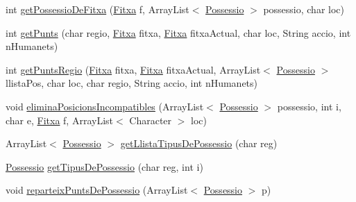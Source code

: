 \begin{DoxyCompactItemize}
int \mbox{\hyperlink{class_tauler_aa60647e3555961f2796381dab7c7f2f7}{get\+Possessio\+De\+Fitxa}} (\mbox{\hyperlink{class_fitxa}{Fitxa}} f, Array\+List$<$ \mbox{\hyperlink{class_possessio}{Possessio}} $>$ possessio, char loc)
\item 
int \mbox{\hyperlink{class_tauler_a39fe2ad5d190905b65b8d86440062ce6}{get\+Punts}} (char regio, \mbox{\hyperlink{class_fitxa}{Fitxa}} fitxa, \mbox{\hyperlink{class_fitxa}{Fitxa}} fitxa\+Actual, char loc, String accio, int n\+Humanets)
\item 
int \mbox{\hyperlink{class_tauler_a6e0887ae8dedc793bace05d8b75dfd98}{get\+Punts\+Regio}} (\mbox{\hyperlink{class_fitxa}{Fitxa}} fitxa, \mbox{\hyperlink{class_fitxa}{Fitxa}} fitxa\+Actual, Array\+List$<$ \mbox{\hyperlink{class_possessio}{Possessio}} $>$ llista\+Pos, char loc, char regio, String accio, int n\+Humanets)
\item 
void \mbox{\hyperlink{class_tauler_a4ee1a514621dca60a453851021c4d91b}{elimina\+Posicions\+Incompatibles}} (Array\+List$<$ \mbox{\hyperlink{class_possessio}{Possessio}} $>$ possessio, int i, char e, \mbox{\hyperlink{class_fitxa}{Fitxa}} f, Array\+List$<$ Character $>$ loc)
\item 
Array\+List$<$ \mbox{\hyperlink{class_possessio}{Possessio}} $>$ \mbox{\hyperlink{class_tauler_afcb2ec44c6e489651e68990a1e65cb49}{get\+Llista\+Tipus\+De\+Possessio}} (char reg)
\item 
\mbox{\hyperlink{class_possessio}{Possessio}} \mbox{\hyperlink{class_tauler_a0595f3ec2a8c32c07fb862a9e723eb99}{get\+Tipus\+De\+Possessio}} (char reg, int i)
\item 
void \mbox{\hyperlink{class_tauler_aa117114485dce6998f2023a6cc178a28}{reparteix\+Punts\+De\+Possessio}} (Array\+List$<$ \mbox{\hyperlink{class_possessio}{Possessio}} $>$ p)
\end{DoxyCompactItemize}
